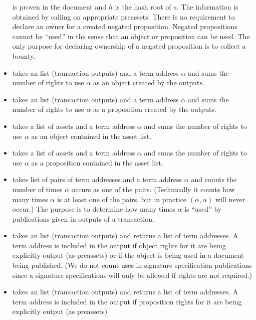 \begin{itemize}
is proven in the document and $h$ is the hash root of $s$.
The information is obtained by calling {} on appropriate preassets.
There is no requirement to declare an owner for a created negated proposition.
Negated propositions cannot be ``used'' in the sense that an object or proposition can
be used. The only purpose for declaring ownership of a negated proposition is to collect a bounty.
\item {} takes an {} list (transaction outputs)
and a term address $\alpha$ and sums the number of rights to use $\alpha$ as an object
created by the outputs.
\item {} takes an {} list (transaction outputs)
and a term address $\alpha$ and sums the number of rights to use $\alpha$ as a proposition
created by the outputs.
\item {} takes a list of assets and a term address $\alpha$
and sums the number of rights to use $\alpha$ as an object contained in the asset list.
\item {} takes a list of assets and a term address $\alpha$
and sums the number of rights to use $\alpha$ as a proposition contained in the asset list.
\item {} takes list of pairs of term addresses and a term address $\alpha$
and counts the number of times $\alpha$ occurs as one of the pairs. (Technically it counts
how many times $\alpha$ is at least one of the pairs, but in practice $(\alpha,\alpha)$ will
never occur.)
The purpose is to determine how many times $\alpha$ is ``used'' by publications
given in outputs of a transaction.
\item {} takes an {} list (transaction outputs)
and returns a list of term addresses.
A term address is included in the output if
object rights for it are being explicitly output
(as {} preassets)
or if the object is being used in a document being published.
(We do not count uses in signature specification publications since
a signature specifications will only be allowed if rights are not required.)
\item {} takes an {} list (transaction outputs)
and returns a list of term addresses.
A term address is included in the output if
proposition rights for it are being explicitly output
(as {} preassets)

\end{itemize}

